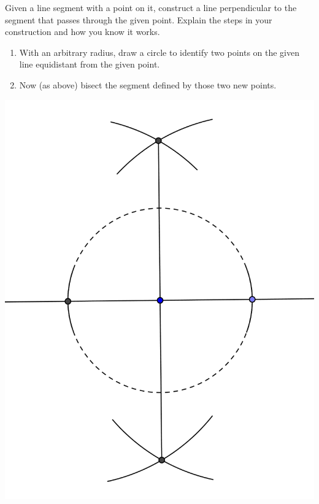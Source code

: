 \documentclass[nooutcomes]{ximera}
\begin{document}
\begin{problem}
Given a line segment with a point on it, construct a line perpendicular to the segment that passes through the given point. Explain the steps in your construction and how you know it works.
\begin{freeResponse}
\begin{hint}
\begin{enumerate}
\item With an arbitrary radius, draw a circle to identify two points on the given line equidistant from the given point. 
\item Now (as above) bisect the segment defined by those two new points. 
\end{enumerate}
\begin{image}
\includegraphics{perpOnLine.png}
\end{image}
\end{hint}
\end{freeResponse}
\end{problem}
\end{document}
